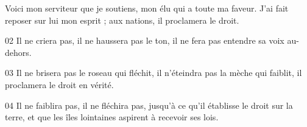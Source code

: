  Voici mon serviteur que je soutiens, mon élu qui a toute ma faveur. J’ai fait reposer sur lui mon esprit ; aux nations, il proclamera le droit.

02 Il ne criera pas, il ne haussera pas le ton, il ne fera pas entendre sa voix au-dehors.

03 Il ne brisera pas le roseau qui fléchit, il n’éteindra pas la mèche qui faiblit, il proclamera le droit en vérité.

04 Il ne faiblira pas, il ne fléchira pas, jusqu’à ce qu’il établisse le droit sur la terre, et que les îles lointaines aspirent à recevoir ses lois.
